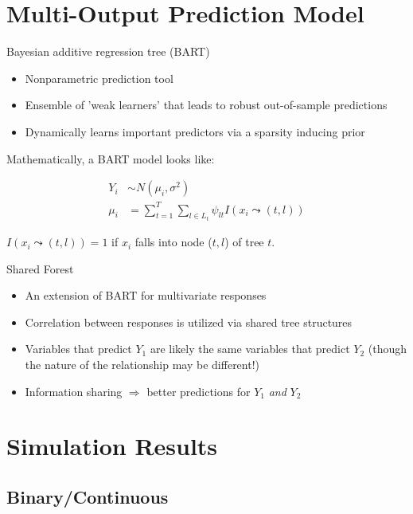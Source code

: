 \documentclass{beamer}
\begin{document}
\section{Multi-Output Prediction Model}

\begin{frame}{Bayesian additive regression tree (BART)}
\begin{itemize}
\item Nonparametric prediction tool
\item Ensemble of 'weak learners' that leads to robust out-of-sample predictions
\item Dynamically learns important predictors via a sparsity inducing prior
\end{itemize}

Mathematically, a BART model looks like:

\begin{align*}
Y_i &\sim N(\mu_i, \sigma^2)\\
\mu_i &= \sum_{t=1}^T \sum_{l \in L_t}\psi_{lt}I(x_i \leadsto (t,l))
\end{align*}

$I(x_i \leadsto (t,l)) = 1$ if $x_i$ falls into node ($t,l$) of tree $t$. 

\end{frame}

\begin{frame}{Shared Forest}
\begin{itemize}
\item An extension of BART for multivariate responses
\item Correlation between responses is utilized via shared tree structures
\item Variables that predict $Y_1$ are likely the same variables that predict $Y_2$ (though the nature of the relationship may be different!)
\item Information sharing $\Rightarrow$ better predictions for $Y_1$ \textit{and} $Y_2$ 
\end{itemize}
\end{frame}



\section{Simulation Results} 

\subsection{Binary/Continuous} 
\end{document}

